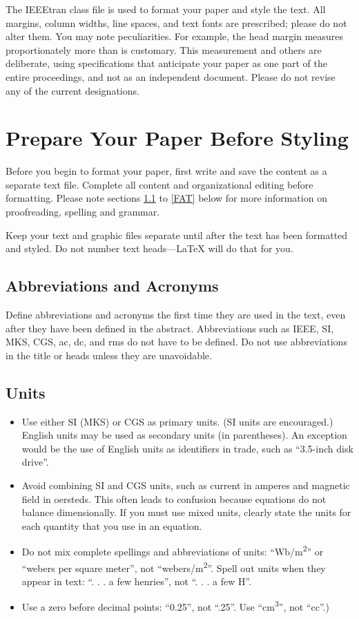 \documentclass[conference]{IEEEtran}
\begin{document}
The IEEEtran class file is used to format your paper and style the text. All margins, 
column widths, line spaces, and text fonts are prescribed; please do not 
alter them. You may note peculiarities. For example, the head margin
measures proportionately more than is customary. This measurement 
and others are deliberate, using specifications that anticipate your paper 
as one part of the entire proceedings, and not as an independent document. 
Please do not revise any of the current designations.

\section{Prepare Your Paper Before Styling}
Before you begin to format your paper, first write and save the content as a 
separate text file. Complete all content and organizational editing before 
formatting. Please note sections \ref{AA} to \ref{FAT} below for more information on 
proofreading, spelling and grammar.

Keep your text and graphic files separate until after the text has been 
formatted and styled. Do not number text heads---{\LaTeX} will do that 
for you.

\subsection{Abbreviations and Acronyms}\label{AA}
Define abbreviations and acronyms the first time they are used in the text, 
even after they have been defined in the abstract. Abbreviations such as 
IEEE, SI, MKS, CGS, ac, dc, and rms do not have to be defined. Do not use 
abbreviations in the title or heads unless they are unavoidable.

\subsection{Units}
\begin{itemize}
\item Use either SI (MKS) or CGS as primary units. (SI units are encouraged.) English units may be used as secondary units (in parentheses). An exception would be the use of English units as identifiers in trade, such as ``3.5-inch disk drive''.
\item Avoid combining SI and CGS units, such as current in amperes and magnetic field in oersteds. This often leads to confusion because equations do not balance dimensionally. If you must use mixed units, clearly state the units for each quantity that you use in an equation.
\item Do not mix complete spellings and abbreviations of units: ``Wb/m\textsuperscript{2}'' or ``webers per square meter'', not ``webers/m\textsuperscript{2}''. Spell out units when they appear in text: ``. . . a few henries'', not ``. . . a few H''.
\item Use a zero before decimal points: ``0.25'', not ``.25''. Use ``cm\textsuperscript{3}'', not ``cc''.)
\end{itemize}
\end{document}
